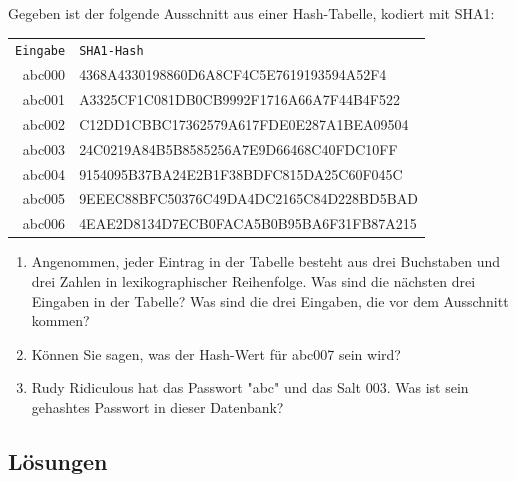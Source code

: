 \documentclass[11pt,a4paper]{report}
\begin{document}
\begin{ex}
Gegeben ist der folgende Ausschnitt aus einer Hash-Tabelle, kodiert mit SHA1:

\begin{tabular}{rl}
\texttt{Eingabe} & \texttt{SHA1-Hash} \\
abc000 & 4368A4330198860D6A8CF4C5E7619193594A52F4 \\
abc001 & A3325CF1C081DB0CB9992F1716A66A7F44B4F522 \\
abc002 & C12DD1CBBC17362579A617FDE0E287A1BEA09504 \\
abc003 & 24C0219A84B5B8585256A7E9D66468C40FDC10FF \\
abc004 & 9154095B37BA24E2B1F38BDFC815DA25C60F045C \\
abc005 & 9EEEC88BFC50376C49DA4DC2165C84D228BD5BAD \\
abc006 & 4EAE2D8134D7ECB0FACA5B0B95BA6F31FB87A215
\end{tabular}

\begin{enumerate}
\item Angenommen, jeder Eintrag in der Tabelle besteht aus drei Buchstaben und drei Zahlen in lexikographischer Reihenfolge.
Was sind die nächsten drei Eingaben in der Tabelle? Was sind die drei Eingaben, die vor dem Ausschnitt kommen?
\item Können Sie sagen, was der Hash-Wert für abc007 sein wird?
\item Rudy Ridiculous hat das Passwort "abc" und das Salt $003$. Was ist sein gehashtes Passwort in dieser Datenbank?
\end{enumerate}
\end{ex}

\subsection{Lösungen}
\printcursols
\end{document}
